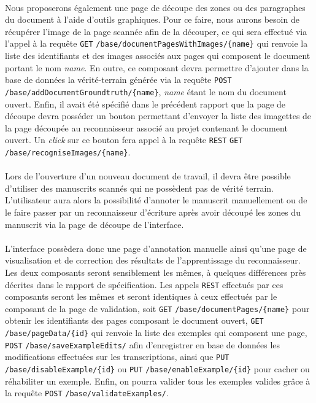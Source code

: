 \paragraph{}
Nous proposerons également une page de découpe des zones ou des paragraphes du document à l’aide d’outils graphiques. Pour ce faire, nous aurons besoin de récupérer l'image de la page scannée afin de la découper, ce qui sera effectué via l'appel à la requête \texttt{GET} \texttt{/base/documentPagesWithImages/\{name\}} qui renvoie la liste des identifiants et des images associés aux pages qui composent le document portant le nom \textit{name}. En outre, ce composant devra permettre d'ajouter dans la base de données la vérité-terrain générée via la requête \texttt{POST} \texttt{/base/addDocumentGroundtruth/\{name\}}, \textit{name} étant le nom du document ouvert. Enfin, il avait été spécifié dans le précédent rapport que la page de découpe devra posséder un bouton permettant d'envoyer la liste des imagettes de la page découpée au reconnaisseur associé au projet contenant le document ouvert. Un \textit{click} sur ce bouton fera appel à la requête \texttt{REST} \texttt{GET} \texttt{/base/recogniseImages/\{name\}}.

\paragraph{}
Lors de l’ouverture d’un nouveau document de travail, il devra être possible d’utiliser des manuscrits scannés qui ne possèdent pas de vérité terrain. L’utilisateur aura alors la possibilité d’annoter le manuscrit manuellement ou de le faire passer par un reconnaisseur d’écriture après avoir découpé les zones du manuscrit via la page de découpe de l’interface.

\paragraph{}
L’interface possèdera donc une page d’annotation manuelle ainsi qu'une page de visualisation et de correction des résultats de l'apprentissage du reconnaisseur. Les deux composants seront sensiblement les mêmes, à quelques différences près décrites dans le rapport de spécification.
\newline{}
Les appels \texttt{REST} effectués par ces composants seront les mêmes et seront identiques à ceux effectués par le composant de la page de validation, soit \texttt{GET} \texttt{/base/documentPages/\{name\}} pour obtenir les identifiants des pages composant le document ouvert, \texttt{GET} \texttt{/base/pageData/\{id\}} qui renvoie la liste des exemples qui composent une page, \texttt{POST} \texttt{/base/saveExampleEdits/} afin d'enregistrer en base de données les modifications effectuées sur les transcriptions, ainsi que \texttt{PUT} \texttt{/base/disableExample/\{id\}} ou \texttt{PUT} \texttt{/base/enableExample/\{id\}} pour cacher ou réhabiliter un exemple. Enfin, on pourra valider tous les exemples valides grâce à la requête \texttt{POST} \texttt{/base/validateExamples/}.

